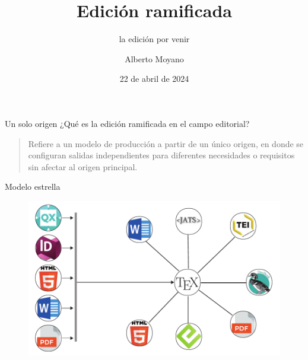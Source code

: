 \documentclass[14pt,aspectratio=169]{beamer}
\title{Edición ramificada}
\subtitle{la edición por venir}
\author{Alberto Moyano}
\date{22 de abril de 2024}
\institute{\url{https://github.com/albertomoyano/CHARLAUBA2}}
\begin{document}
	\begin{frame}
		\titlepage
	\end{frame}

\begin{frame}{Un solo origen}
	¿Qué es la edición ramificada en el campo editorial?\vspace{14pt}

	\begin{quote}
	Refiere a un modelo de producción a partir de un único origen, en donde se configuran salidas independientes para diferentes necesidades o requisitos sin afectar al origen principal.
	\end{quote}
\end{frame}

\begin{frame}{Modelo estrella}
	\begin{figure}
		\centering
		\includegraphics[width=.7\textwidth]{estrella.pdf}
	\end{figure}
\end{frame}

\end{document}
